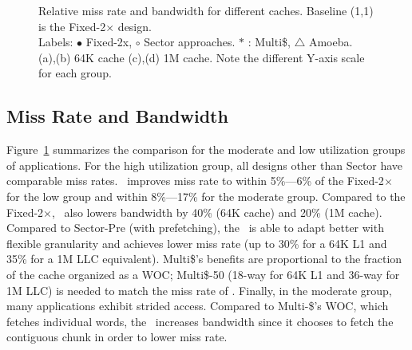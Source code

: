 {{\begin{figure}[!ht]
  \caption[\AC\ Comparison]{Relative miss rate and bandwidth for different caches. Baseline (1,1) is the Fixed-2$\times$ design. \\
    Labels: {\bf \large $\bullet$} Fixed-2x, {\large \bf $\circ$}
    Sector approaches. {\large \bf $\ast$} : Multi\$, $\bigtriangleup$ Amoeba. \\ 
    (a),(b) 64K cache (c),(d) 1M cache. Note the different Y-axis scale for each group.}
  \label{fig:scatter_comp}
\end{figure}

\clearpage

\subsection{Miss Rate and Bandwidth}
Figure~\ref{fig:scatter_comp} summarizes the comparison for the moderate and low utilization groups of applications. For the high utilization group, all designs other than Sector have comparable miss rates. \AC\ improves miss rate to within 5\%---6\% of the Fixed-2$\times$ for the low group and within 8\%---17\% for the moderate group. Compared to the Fixed-2$\times$, \AC\ also lowers bandwidth by 40\% (64K cache) and 20\% (1M cache). Compared to Sector-Pre (with prefetching), the \AC\ is able to adapt better with flexible granularity and achieves lower miss rate (up to 30\% for a 64K L1 and 35\% for a 1M LLC equivalent). Multi\$'s benefits are proportional to the fraction of the cache organized as a WOC; Multi\$-50 (18-way for 64K L1 and 36-way for 1M LLC) is needed to match the miss rate of \AC{}. Finally, in the moderate group, many applications exhibit strided access. Compared to Multi-\$'s WOC, which fetches individual words, the \AC\ increases bandwidth since it chooses to fetch the contiguous chunk in order to lower miss rate.

}}
